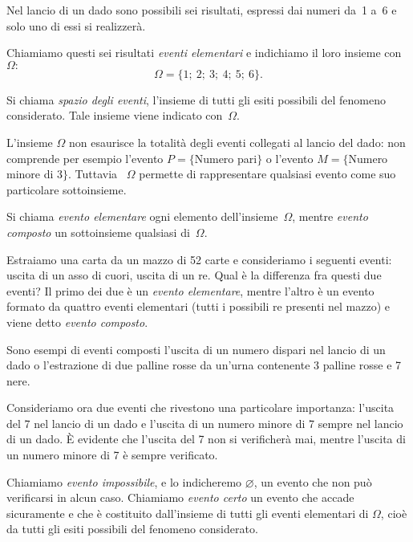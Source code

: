 Nel lancio di un dado sono possibili sei risultati, espressi dai numeri 
da~1 a~6 e solo uno di essi si realizzerà.

Chiamiamo questi sei risultati \emph{eventi elementari} e indichiamo il 
loro insieme con 
\(\Omega:\) 
\[\Omega =\{1;~2;~3;~4;~5;~6\}.\]

\begin{definizione}
Si chiama \emph{spazio degli eventi}, l'insieme di tutti gli esiti 
possibili del fenomeno considerato. 
Tale insieme viene indicato con~\(\Omega\).
\end{definizione}

L'insieme \(\Omega \) non esaurisce la totalità degli eventi collegati al 
lancio del dado: non comprende per esempio 
l'evento \(P=\{\)Numero pari\(\}\) o 
l'evento \(M=\{\)Numero minore di \(3\}\). 
Tuttavia~ \(\Omega \) permette di rappresentare qualsiasi evento come suo 
particolare sottoinsieme.

\begin{definizione}
Si chiama \emph{evento elementare} ogni elemento 
dell'insieme~\(\Omega\), 
mentre \emph{evento composto} un sottoinsieme qualsiasi di~\(\Omega\).
\end{definizione}

Estraiamo una carta da un mazzo di 52 carte e consideriamo i seguenti 
eventi: 
uscita di un asso di cuori, uscita di un re. Qual è la differenza fra 
questi due eventi? 
Il primo dei due è un \emph{evento elementare}, mentre l'altro è un 
evento formato da quattro eventi elementari (tutti i possibili re presenti 
nel mazzo) e viene detto \emph{evento composto}.

Sono esempi di eventi composti l'uscita di un numero dispari nel lancio di 
un dado o l'estrazione di due palline rosse da un'urna contenente 3 palline 
rosse e 7 nere.

Consideriamo ora due eventi che rivestono una particolare importanza: 
l'uscita del 7 nel lancio di un dado e l'uscita di un numero minore di 7 
sempre nel lancio di un dado. 
È evidente che l'uscita del 7 non si verificherà mai, 
mentre l'uscita di un numero minore di 7 è sempre verificato.

\begin{definizione}
Chiamiamo \emph{evento impossibile}, e lo indicheremo \(\varnothing\), un 
evento che non può verificarsi in alcun caso.
Chiamiamo \emph{evento certo} un evento che accade sicuramente e che è 
costituito dall'insieme di tutti gli eventi elementari di \(\Omega \), cioè 
da tutti gli esiti possibili del fenomeno considerato.
\end{definizione}


